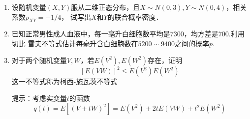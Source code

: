 \begin{enumerate}
    \item 设随机变量$(X,Y)$服从二维正态分布，且$X\sim N(0,3),Y\sim N(0,4)$，相关系数$\rho_{XY}=-1/4$，
    试写出$X$和$Y$的联合概率密度．
    
    
    \item 已知正常男性成人血液中，每一亳升白细胞数平均是7300，均方差是700.利用切比
    雪夫不等式估计每毫升含白细胞数在$5200\sim 9400$之间的概率$p$.
    
    
    \item 对于两个随机变量$V,W$，若$E(V^2),E(W^2)$存在，证明
    $$[E(VW)]^2\leq E(V^2)E(W^2)$$
    这一不等式称为柯西-施瓦茨不等式
    \par 提示：考虑实变量$t$的函数
    $$q(t)=E[(V+tW)^2]=E(V^2)+2tE(VW)+t^2E(W^2)$$




  

\end{enumerate}
